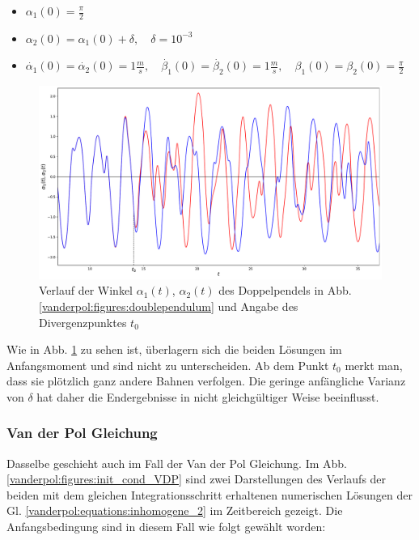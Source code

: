 \begin{itemize}
\item
$\alpha_1(0) = \frac{\pi}{2}$
\item
$\alpha_2(0) = \alpha_1(0) + \delta, \quad \delta = 10^{-3}$
\item
$\dot{\alpha_1}(0) = \dot{\alpha_2}(0)= 1 \frac{m}{s}, \quad \dot{\beta_1}(0) = \dot{\beta_2}(0)= 1 \frac{m}{s}, \quad \beta_1(0)=\beta_2(0)=\frac{\pi}{2}$
\end{itemize}

\begin{figure}
\includegraphics[width=\textwidth]{papers/vanderpol/figures/initial_cond_DBLPEND.pdf}
\caption{Verlauf der Winkel $\alpha_1(t)$, $\alpha_2(t)$ des Doppelpendels in Abb. \ref{vanderpol:figures:doublependulum} und Angabe des Divergenzpunktes $t_0$\label{vanderpol:figures:init_cond_dbl_pend}}
\end{figure}
\noindent Wie in Abb. \ref{vanderpol:figures:init_cond_dbl_pend} zu sehen ist, überlagern sich die beiden Lösungen im Anfangsmoment und sind nicht zu unterscheiden. Ab dem Punkt $t_0$ merkt man, dass sie plötzlich ganz andere Bahnen verfolgen. Die geringe anfängliche Varianz von $\delta$ hat daher die Endergebnisse in nicht gleichgültiger Weise beeinflusst.
\subsubsection{Van der Pol Gleichung}
\label{vanderpol:subsubsection:vdp}
Dasselbe geschieht auch im Fall der Van der Pol Gleichung. Im  Abb. \ref{vanderpol:figures:init_cond_VDP} sind zwei Darstellungen des Verlaufs der beiden mit dem gleichen Integrationsschritt erhaltenen numerischen Lösungen der Gl. \ref{vanderpol:equations:inhomogene_2} im Zeitbereich gezeigt. Die Anfangsbedingung sind in diesem Fall wie folgt gewählt worden:

